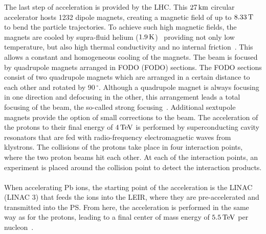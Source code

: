The last step of acceleration is provided by the \ac{LHC}. This $27\,\rm{km}$ circular accelerator hosts 1232 dipole magnets, creating a magnetic field of up to $8.33\,\rm{T}$ to bend the particle trajectories. To achieve such high magnetic fields, the magnets are cooled by supra-fluid helium ($1.9\,\rm{K}$)~\cite{Bru04} providing not only low temperature, but also high thermal conductivity and no internal friction~\cite{Lei70}. This allows a constant and homogeneous cooling of the magnets. The beam is focused by quadrupole magnets arranged in \acs{FODO} (\acl{FODO}) sections. The \acs{FODO} sections consist of two quadrupole magnets which are arranged in a certain distance to each other and rotated by $90\,^{\circ}$. Although a quadrupole magnet is always focusing in one direction and defocusing in the other, this arrangement leads a total focusing of the beam, the so-called strong focusing~\cite{Bet67}. Additional sextupole magnets provide the option of small corrections to the beam. The acceleration of the protons to their final energy of $4\,\rm{TeV}$ is performed by superconducting cavity resonators that are fed with radio-frequency electromagnetic waves from klystrons. The collisions of the protons take place in four interaction points, where the two proton beams hit each other. At each of the interaction points, an experiment is placed around the collision point to detect the interaction products.\\
\\When accelerating Pb ions, the starting point of the acceleration is the \acl{LINAC} (\acs{LINAC} 3) that feeds the ions into the \ac{LEIR}, where they are pre-accelerated and transmitted into the \ac{PS}. From here, the acceleration is performed in the same way as for the protons, leading to a final center of mass energy of $5.5\,\rm{TeV}$ per nucleon~\cite{Ber12}.

